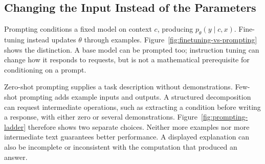 \subsection{Changing the Input Instead of the Parameters}

Prompting conditions a fixed model on context $c$, producing $p_\theta(y\mid c,x)$. Fine-tuning instead updates $\theta$ through examples. Figure~\ref{fig:finetuning-vs-prompting} shows the distinction. A base model can be prompted too; instruction tuning can change how it responds to requests, but is not a mathematical prerequisite for conditioning on a prompt.

\par\addvspace{\intextsep}\noindent\begin{minipage}{\linewidth}
\centering
{}
\label{fig:finetuning-vs-prompting}
\end{minipage}\par\addvspace{\intextsep}

Zero-shot prompting supplies a task description without demonstrations. Few-shot prompting adds example inputs and outputs. A structured decomposition can request intermediate operations, such as extracting a condition before writing a response, with either zero or several demonstrations. Figure~\ref{fig:prompting-ladder} therefore shows two separate choices. Neither more examples nor more intermediate text guarantees better performance. A displayed explanation can also be incomplete or inconsistent with the computation that produced an answer.


